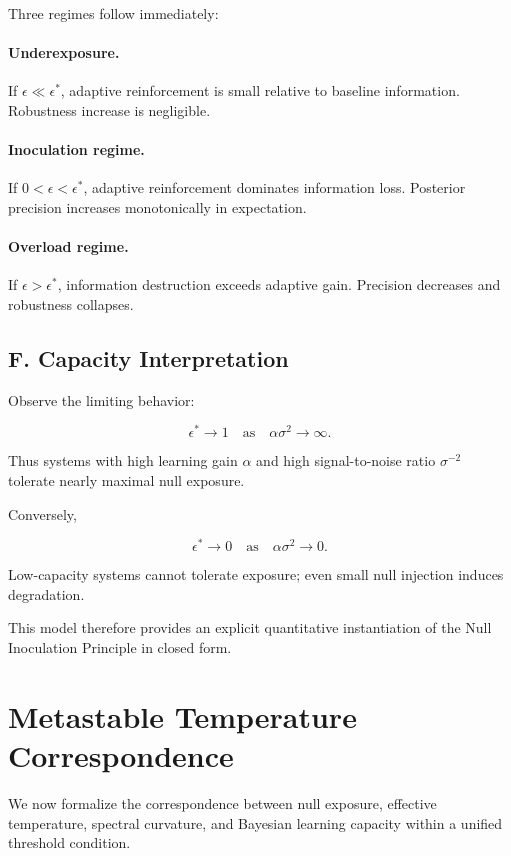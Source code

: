 \documentclass[11pt]{article}
\theoremstyle{remark}
\begin{document}
Three regimes follow immediately:

\paragraph{Underexposure.}
If $\epsilon \ll \epsilon^*$, adaptive reinforcement is small relative to baseline information. Robustness increase is negligible.

\paragraph{Inoculation regime.}
If $0 < \epsilon < \epsilon^*$, adaptive reinforcement dominates information loss. Posterior precision increases monotonically in expectation.

\paragraph{Overload regime.}
If $\epsilon > \epsilon^*$, information destruction exceeds adaptive gain. Precision decreases and robustness collapses.

\subsection*{F. Capacity Interpretation}

Observe the limiting behavior:

\[
\epsilon^* \to 1
\quad \text{as} \quad
\alpha \sigma^2 \to \infty.
\]

Thus systems with high learning gain $\alpha$ and high signal-to-noise ratio $\sigma^{-2}$ tolerate nearly maximal null exposure.

Conversely,

\[
\epsilon^* \to 0
\quad \text{as} \quad
\alpha \sigma^2 \to 0.
\]

Low-capacity systems cannot tolerate exposure; even small null injection induces degradation.

This model therefore provides an explicit quantitative instantiation of the Null Inoculation Principle in closed form.

\section{Metastable Temperature Correspondence}
\label{app:temperature}

We now formalize the correspondence between null exposure, effective temperature, spectral curvature, and Bayesian learning capacity within a unified threshold condition.
\end{document}
